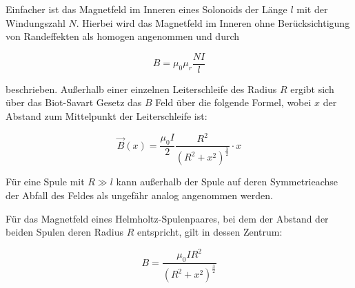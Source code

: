 Einfacher ist das Magnetfeld im Inneren eines Solonoids der Länge $l$ 
mit der Windungszahl $N$. Hierbei wird das Magnetfeld im Inneren ohne
Berücksichtigung von Randeffekten als homogen angenommen und durch 

\begin{equation}
    \label{eqn:bhom}
    B = \mu_0 \mu_r \frac{NI}l 
\end{equation}

beschrieben. Außerhalb einer einzelnen Leiterschleife des Radius $R$ ergibt sich über das 
Biot-Savart Gesetz das $B$ Feld über die folgende Formel, wobei $x$ der Abstand zum Mittelpunkt
der Leiterschleife ist:

\begin{equation}
    \label{eqn:bvonx}
    \vec B(x)= \frac{\mu_0 I}{2} \frac{R^2}{(R^2 + x^2)^\frac{3}2}\cdot x
\end{equation}

Für eine Spule mit $R \gg l$ kann außerhalb der Spule auf deren Symmetrieachse der Abfall des Feldes 
als ungefähr analog angenommen werden.

Für das Magnetfeld eines Helmholtz-Spulenpaares, bei dem der Abstand der beiden 
Spulen deren Radius $R$ entspricht, gilt in dessen Zentrum:

\begin{equation}
    \label{eqn:bhelmholtz}
    B = \frac{\mu_0 I R^2}{({R^2}+{x^2})^\frac{3}2}
\end{equation}


